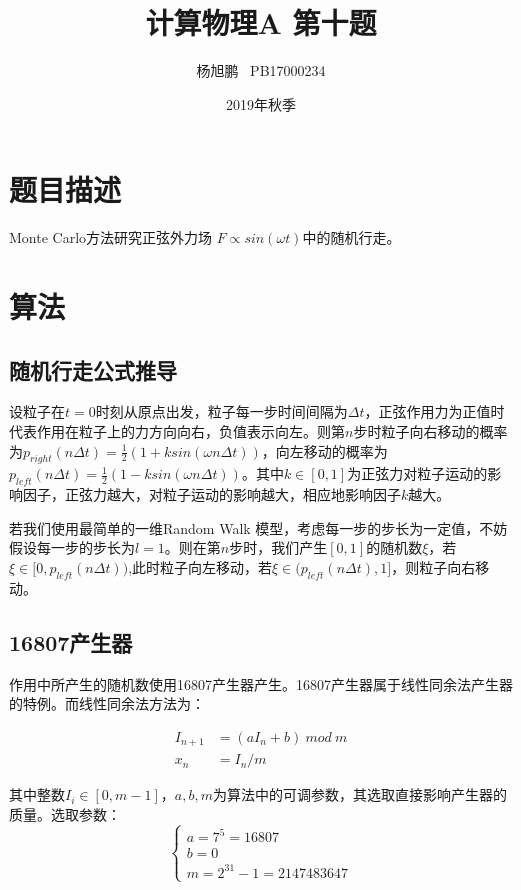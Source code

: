 \documentclass[a4paper,11pt]{article}
\author{ 杨旭鹏  \  PB17000234}
\date{2019年秋季}
\title{计算物理A 第十题}
\begin{document}
\maketitle
\tableofcontents

\section{题目描述}
Monte Carlo⽅法研究正弦外⼒场 $F \propto sin(\omega t)$中的随机⾏⾛。

\section{算法}
\subsection{随机行走公式推导}
设粒子在$t = 0$时刻从原点出发，粒子每一步时间间隔为$\Delta t$，正弦作用力为正值时代表作用在粒子上的力方向向右，负值表示向左。则第$n$步时粒子向右移动的概率为$p_{right}(n\Delta t) = \frac{1}{2}(1+k sin(\omega n\Delta t))$，向左移动的概率为$p_{left}(n\Delta t) = \frac{1}{2}(1-k sin(\omega n\Delta t))$。其中$k \in [0,1]$为正弦力对粒子运动的影响因子，正弦力越大，对粒子运动的影响越大，相应地影响因子$k$越大。

若我们使用最简单的一维Random Walk 模型，考虑每一步的步长为一定值，不妨假设每一步的步长为$l = 1$。则在第$n$步时，我们产生$[0,1]$的随机数$\xi$，若$\xi \in [0,p_{left}(n\Delta t))$,此时粒子向左移动，若$\xi \in (p_{left}(n \Delta t),1]$，则粒子向右移动。




\subsection{16807产生器}
作用中所产生的随机数使用16807产生器产生。16807产生器属于线性同余法产生器的特例。而线性同余法方法为：

\begin{equation}
\begin{aligned}
	I_{n+1} &= (aI_{n} + b) \ mod \ m \\
	x_{n} &= I_{n}/m
\end{aligned}
\label{linear}	
\end{equation}

其中整数$I_{i} \in [0,m-1]$，$a,b,m$为算法中的可调参数，其选取直接影响产生器的质量。选取参数：
\begin{equation}
\left\{
\begin{array}{l}
	a = 7^{5} = 16807 \\
	b = 0 \\
	m = 2^{31}-1 = 2147483647
\end{array}
\right.
\end{equation}
\end{document}
